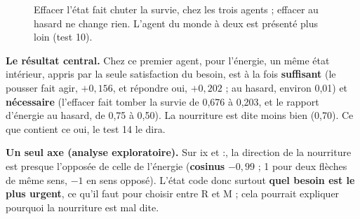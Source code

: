 \documentclass[fontsize=10pt,paper=a4,parskip=half-]{scrartcl}
\newcommand{\q}[1]{\og #1\fg{}}
\begin{document}
\begin{figure}[h]
\centering
{}
\caption{Effacer l'état fait chuter la survie, chez les trois agents ; effacer au hasard ne
change rien. L'agent du monde à deux est présenté plus loin (test 10).}
\label{fig:lesion}
\end{figure}

\begin{essentiel}
\textbf{Le résultat central.} Chez ce premier agent, pour l'énergie, un même état
intérieur, appris par la seule satisfaction du besoin, est à la fois \textbf{suffisant}
(le pousser fait agir, $+0,156$, et répondre \q{oui}, $+0,202$ ; au hasard, environ
0,01) et \textbf{nécessaire} (l'effacer fait tomber la survie de 0,676 à 0,203, et le
rapport d'énergie au hasard, de 0,75 à 0,50). La nourriture est dite moins bien (0,70).
Ce que contient ce \q{oui}, le test 14 le dira.
\end{essentiel}

\textbf{Un seul axe (analyse exploratoire).} Sur \q{ix} et \q{:}, la direction de la
nourriture est presque l'opposée de celle de l'énergie (\textbf{cosinus} $-0,99$ ; 1 pour
deux flèches de même sens, $-1$ en sens opposé). L'état code donc surtout \textbf{quel
besoin est le plus urgent}, ce qu'il faut pour choisir entre R et M ; cela pourrait
expliquer pourquoi la nourriture est mal dite.
\end{document}
